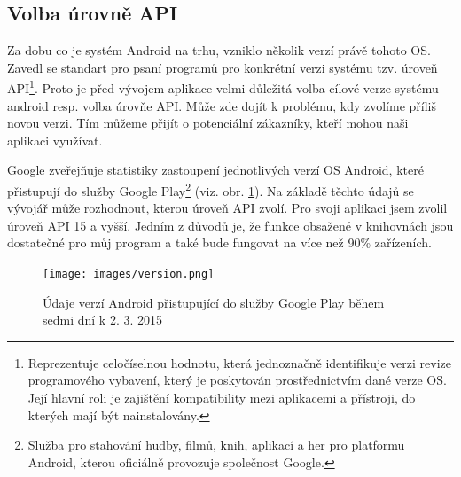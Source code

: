 \documentclass[12pt]{article}
\begin{document}
\subsection{Volba úrovně API}
Za dobu co je systém Android na trhu, vzniklo několik verzí právě tohoto OS. Zavedl se standart pro psaní programů pro konkrétní verzi systému tzv. úroveň API\footnote[2]{Reprezentuje celočíselnou hodnotu, která jednoznačně identifikuje verzi revize programového vybavení, který je poskytován prostřednictvím dané verze OS. Její hlavní roli je zajištění kompatibility mezi aplikacemi a přístroji, do kterých mají být nainstalovány.}. Proto je před vývojem aplikace velmi důležitá volba cílové verze systému android resp. volba úrovňe API. Může zde dojít k problému, kdy zvolíme příliš novou verzi. Tím můžeme přijít o potenciální zákazníky, kteří mohou naši aplikaci využívat.

Google zveřejňuje statistiky zastoupení jednotlivých verzí OS Android, které přistupují do služby Google Play\footnote[3]{Služba pro stahování hudby, filmů, knih, aplikací a her pro platformu Android, kterou oficiálně provozuje společnost Google.} (viz. obr. \ref{api}).
Na základě těchto údajů se vývojář může rozhodnout, kterou úroveň API zvolí. Pro svoji aplikaci jsem zvolil úroveň API 15 a vyšší. Jedním z důvodů je, že funkce obsažené v knihovnách jsou dostatečné pro můj program a také bude fungovat na více než 90\% zařízeních.
\begin{figure}[ht]
\centerline{\texttt{[image: images/version.png]}}
\caption{Údaje verzí Android přistupující do služby Google Play během sedmi dní k 2. 3. 2015\cite{volba}} \label{api}
\end{figure}
\end{document}
